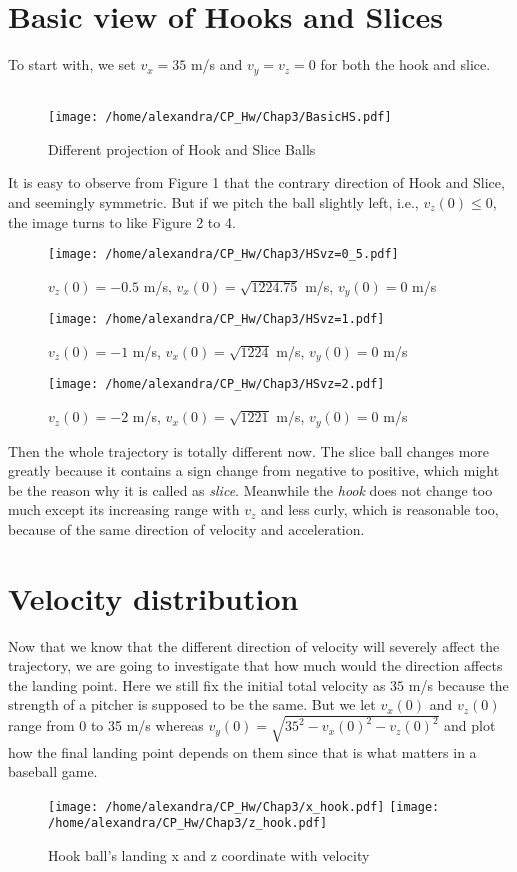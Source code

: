\documentclass{article}
\begin{document}
\section{Basic view of Hooks and Slices}
To start with, we set $v_x=35$ m/s and $v_y=v_z=0$ for both the hook and slice.\\\\
\begin{figure}[htbp]
\centering
\texttt{[image: /home/alexandra/CP\_Hw/Chap3/BasicHS.pdf]}
\caption{Different projection of Hook and Slice Balls}
\end{figure}
It is easy to observe from Figure 1 that the contrary direction of Hook and Slice, and seemingly symmetric. But if we pitch the ball slightly left, i.e., $v_z(0)\leq 0$, the image turns to like Figure 2 to 4.\\
\begin{figure}[htbp]
\centering
\texttt{[image: /home/alexandra/CP\_Hw/Chap3/HSvz=0\_5.pdf]}
\caption{$v_z(0)=-0.5$ m/s, $v_x(0)=\sqrt{1224.75}$ m/s, $v_y(0)=0$ m/s}
\end{figure}
\begin{figure}[htbp]
\centering
\texttt{[image: /home/alexandra/CP\_Hw/Chap3/HSvz=1.pdf]}
\caption{$v_z(0)=-1$ m/s, $v_x(0)=\sqrt{1224}$ m/s, $v_y(0)=0$ m/s}
\end{figure}
\begin{figure}[htbp]
\centering
\texttt{[image: /home/alexandra/CP\_Hw/Chap3/HSvz=2.pdf]}
\caption{$v_z(0)=-2$ m/s, $v_x(0)=\sqrt{1221}$ m/s, $v_y(0)=0$ m/s}
\end{figure}
Then the whole trajectory is totally different now. The slice ball changes more greatly because it contains a sign change from negative to positive, which might be the reason why it is called as \emph{slice}. Meanwhile the \emph{hook} does not change too much except its increasing range with $v_z$ and less curly, which is reasonable too, because of the same direction of velocity and acceleration.
\section{Velocity distribution}
	\noindent \sf Now that we know that the different direction of velocity will severely affect the trajectory, we are going to investigate that how much would the direction affects the landing point. Here we still fix the initial total velocity as $35$ m/s because the strength of a pitcher is supposed to be the same. But we let $v_x(0)$ and $v_z(0)$ range from 0 to 35 m/s whereas $v_y(0)=\sqrt{35^2-v_x(0)^2-v_z(0)^2}$ and plot how the final landing point depends on them since that is what matters in a baseball game.  \\
\begin{figure}[htbp]
\centering
\texttt{[image: /home/alexandra/CP\_Hw/Chap3/x\_hook.pdf]}
\texttt{[image: /home/alexandra/CP\_Hw/Chap3/z\_hook.pdf]}
\caption{Hook ball's landing x and z coordinate with  velocity}
\end{figure}
\end{document}
